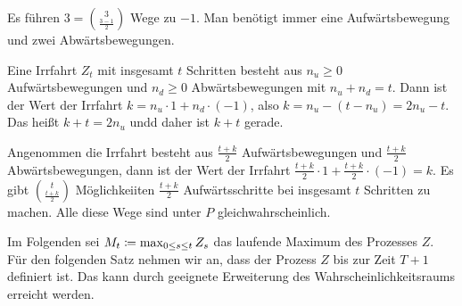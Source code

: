 \documentclass[a4paper,twoside,DIV15,BCOR12mm]{scrbook}
\begin{document}
\begin{bemerkung}
Es führen $3 = \binom{3}{\frac{3-1}{2}}$ Wege zu $-1$. Man benötigt immer eine Aufwärtsbewegung und zwei Abwärtsbewegungen.
\begin{center}
\end{center}
Eine Irrfahrt $Z_t$ mit insgesamt $t$ Schritten besteht aus $n_u\ge 0$ Aufwärtsbewegungen und $n_d\ge 0$ Abwärtsbewegungen mit $n_u + n_d = t$. Dann ist der Wert der Irrfahrt $k = n_u \cdot 1 + n_d \cdot (-1)$, also $k = n_u - (t-n_u) = 2n_u - t$.
Das heißt $k+t = 2n_u$ undd daher ist $k+t$ gerade.

Angenommen die Irrfahrt besteht aus $\frac{t+k}2$ Aufwärtsbewegungen und $\frac{t+k}2$ Abwärtsbewegungen, dann ist der Wert der Irrfahrt $\frac{t+k}2\cdot 1 + \frac{t+k}2\cdot (-1) = k$. Es gibt $\binom{t}{\frac{t+k}2}$ Möglichkeiiten $\frac{t+k}2$ Aufwärtsschritte bei insgesamt $t$ Schritten zu machen. Alle diese Wege sind unter $P$ gleichwahrscheinlich.
\end{bemerkung}

Im Folgenden sei $M_t \da \max_{0\le s\le t} Z_s$ das laufende Maximum des Prozesses $Z$. Für den folgenden Satz nehmen wir an, dass der Prozess $Z$ bis zur Zeit $T+1$ definiert ist. Das kann durch geeignete Erweiterung des Wahrscheinlichkeitsraums erreicht werden.
\end{document}

